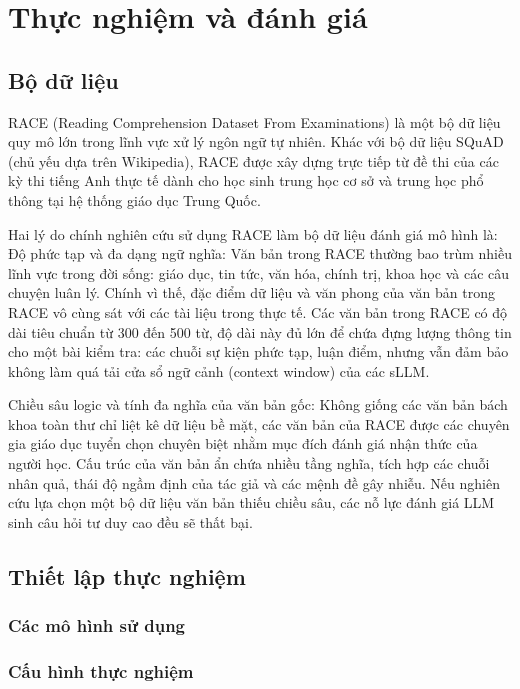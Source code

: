 \chapter{Thực nghiệm và đánh giá}

\section{Bộ dữ liệu}
RACE (Reading Comprehension Dataset From Examinations) là một bộ dữ liệu quy mô lớn trong lĩnh vực xử lý ngôn ngữ tự nhiên. Khác với bộ dữ liệu SQuAD (chủ yếu dựa trên Wikipedia), RACE được xây dựng trực tiếp từ đề thi của các kỳ thi tiếng Anh thực tế dành cho học sinh trung học cơ sở và trung học phổ thông tại hệ thống giáo dục Trung Quốc.

Hai lý do chính nghiên cứu sử dụng RACE làm bộ dữ liệu đánh giá mô hình là:
Độ phức tạp và đa dạng ngữ nghĩa: Văn bản trong RACE thường bao trùm nhiều lĩnh vực trong đời sống: giáo dục, tin tức, văn hóa, chính trị, khoa học và các câu chuyện luân lý. Chính vì thế, đặc điểm dữ liệu và văn phong của văn bản trong RACE vô cùng sát với các tài liệu trong thực tế. Các văn bản trong RACE có độ dài tiêu chuẩn từ 300 đến 500 từ, độ dài này đủ lớn để chứa đựng lượng thông tin cho một bài kiểm tra: các chuỗi sự kiện phức tạp, luận điểm, nhưng vẫn đảm bảo không làm quá tải cửa sổ ngữ cảnh (context window) của các sLLM.

Chiều sâu logic và tính đa nghĩa của văn bản gốc: Không giống các văn bản bách khoa toàn thư chỉ liệt kê dữ liệu bề mặt, các văn bản của RACE được các chuyên gia giáo dục tuyển chọn chuyên biệt nhằm mục đích đánh giá nhận thức của người học. Cấu trúc của văn bản ẩn chứa nhiều tầng nghĩa, tích hợp các chuỗi nhân quả, thái độ ngầm định của tác giả và các mệnh đề gây nhiễu. Nếu nghiên cứu lựa chọn một bộ dữ liệu văn bản thiếu chiều sâu, các nỗ lực đánh giá LLM sinh câu hỏi tư duy cao đều sẽ thất bại.

\section{Thiết lập thực nghiệm}
\subsection{Các mô hình sử dụng}
\subsection{Cấu hình thực nghiệm}

